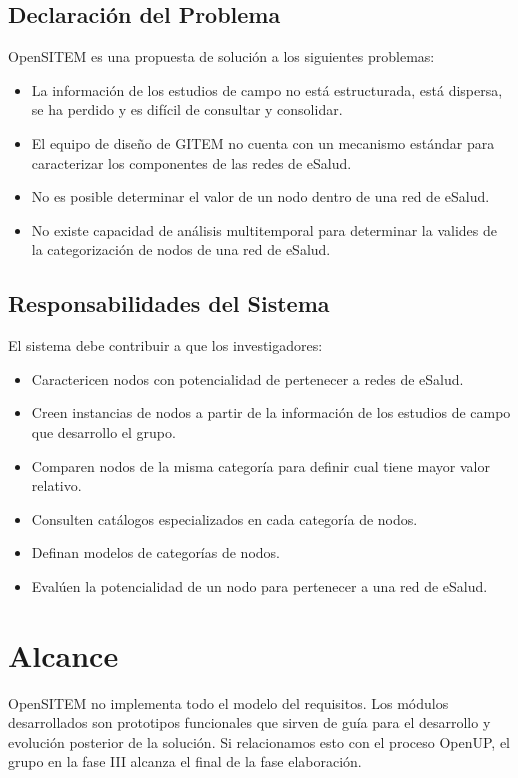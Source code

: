 \subsection{Declaración del Problema}

OpenSITEM es una propuesta de solución a los siguientes problemas:

\begin{itemize}
 \item La información de los estudios de campo no está estructurada, está dispersa, se ha perdido y es difícil de consultar y consolidar.
 \item El equipo de diseño de GITEM no cuenta con un mecanismo estándar para caracterizar los componentes de las redes de eSalud.
 \item No es posible determinar el valor de un nodo dentro de una red de eSalud.
 \item No existe capacidad de análisis multitemporal para determinar la valides de la categorización de nodos de una red de eSalud.
\end{itemize}

\subsection{Responsabilidades del Sistema}

El sistema debe contribuir a que los investigadores:

\begin{itemize}

\item Caractericen nodos con potencialidad de pertenecer a redes de eSalud.
\item Creen instancias de nodos a partir de la información de los estudios de campo que desarrollo el grupo.
\item Comparen nodos de la misma categoría para definir cual tiene mayor valor relativo.
\item Consulten catálogos especializados en cada categoría de nodos.
\item Definan modelos de categorías de nodos.
\item Evalúen la potencialidad de un nodo para pertenecer a una red de eSalud.
\end{itemize}


\section{Alcance}

OpenSITEM no implementa todo el modelo del requisitos. Los módulos desarrollados son prototipos funcionales que sirven de guía para el desarrollo y evolución posterior de la solución. Si relacionamos esto con el proceso OpenUP, el grupo en la fase III alcanza el final de la fase elaboración.

